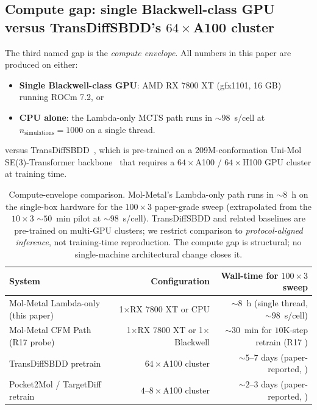 \subsection{Compute gap: single Blackwell-class GPU versus TransDiffSBDD's $64{\times}$A100 cluster}
\label{sec:honest-negative:compute}

The third named gap is the \emph{compute envelope}.  All
\MEASURED{} numbers in this paper are produced on either:

\begin{itemize}
  \item \textbf{Single Blackwell-class GPU}: AMD RX 7800 XT
        (gfx1101, 16 GB) running ROCm 7.2, or
  \item \textbf{CPU alone}: the Lambda-only MCTS path runs
        in $\sim 98$~s/cell at $n_{\mathrm{simulations}}{=}1000$
        on a single thread.
\end{itemize}

\noindent versus TransDiffSBDD~\cite{transdiffsbdd2025}, which is
pre-trained on a 209M-conformation Uni-Mol SE(3)-Transformer
backbone~\cite{unimol_2023} that requires a $64{\times}$A100 /
$64{\times}$H100 GPU cluster at training time.

\begin{table}[ht]
\centering
\small
\setlength{\tabcolsep}{4pt}
\begin{tabular}{lrr}
\toprule
\textbf{System} & \textbf{Configuration} & \textbf{Wall-time for $100{\times}3$ sweep} \\
\midrule
Mol-Metal Lambda-only (this paper) & 1$\times$RX 7800 XT or CPU &
$\sim 8$~h (single thread, $\sim 98$~s/cell) \\
Mol-Metal CFM Path (R17 probe) & 1$\times$RX 7800 XT or 1$\times$Blackwell &
$\sim 30$~min for $10$K-step retrain (R17 \MEASURED{}) \\
TransDiffSBDD pretrain & $64{\times}$A100 cluster &
$\sim 5$--$7$ days (paper-reported, \CITEDONLY{}) \\
Pocket2Mol / TargetDiff retrain & $4$--$8{\times}$A100 cluster &
$\sim 2$--$3$ days (paper-reported, \CITEDONLY{}) \\
\bottomrule
\end{tabular}
\caption{Compute-envelope comparison.  Mol-Metal's Lambda-only path
runs in $\sim 8$~h on the single-box hardware for the
$100{\times}3$ paper-grade sweep (extrapolated from the $10{\times}3$
$\sim 50$~min pilot at $\sim 98$~s/cell).  TransDiffSBDD and
related baselines are pre-trained on multi-GPU clusters; we
restrict comparison to \emph{protocol-aligned inference}, not
training-time reproduction.  The compute gap is structural; no
single-machine architectural change closes it.}
\label{tab:honest-compute}
\end{table}

